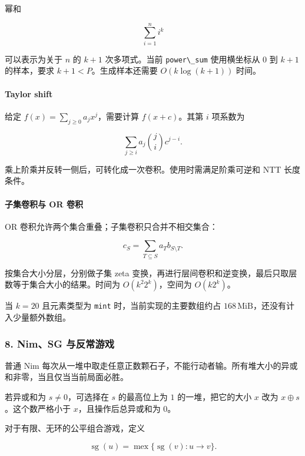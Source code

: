 幂和

\[
\sum_{i=1}^{n}i^k
\]

可以表示为关于 \(n\) 的 \(k+1\) 次多项式。当前 \passthrough{\lstinline!power\_sum!} 使用横坐标从 \(0\) 到 \(k+1\) 的样本，要求 \(k+1<P\)。生成样本还需要 \(O(k\log(k+1))\) 时间。

\hypertarget{taylor-shift}{%
\paragraph{Taylor shift}\label{taylor-shift}}

给定 \(f(x)=\sum_{j\ge0}a_jx^j\)，需要计算 \(f(x+c)\)。其第 \(i\) 项系数为

\[
\sum_{j\ge i}a_j\binom{j}{i}c^{j-i}.
\]

乘上阶乘并反转一侧后，可转化成一次卷积。使用时需满足阶乘可逆和 NTT 长度条件。

\hypertarget{ux5b50ux96c6ux5377ux79efux4e0e-or-ux5377ux79ef}{%
\paragraph{子集卷积与 OR 卷积}\label{ux5b50ux96c6ux5377ux79efux4e0e-or-ux5377ux79ef}}

OR 卷积允许两个集合重叠；子集卷积只合并不相交集合：

\[
c_S=\sum_{T\subseteq S}a_T b_{S\setminus T}.
\]

按集合大小分层，分别做子集 zeta 变换，再进行层间卷积和逆变换，最后只取层数等于集合大小的结果。时间为 \(O(k^2 2^k)\)，空间为 \(O(k2^k)\)。

当 \(k=20\) 且元素类型为 \passthrough{\lstinline!mint!} 时，当前实现的主要数组约占 \(168\,\mathrm{MiB}\)，还没有计入少量额外数组。

\hypertarget{nimsg-ux4e0eux53cdux5e38ux6e38ux620f}{%
\subsubsection{8. Nim、SG 与反常游戏}\label{nimsg-ux4e0eux53cdux5e38ux6e38ux620f}}

普通 Nim 每次从一堆中取走任意正数颗石子，不能行动者输。所有堆大小的异或和非零，当且仅当当前局面必胜。

若异或和为 \(s\ne0\)，可选择在 \(s\) 的最高位上为 \(1\) 的一堆，把它的大小 \(x\) 改为 \(x\mathbin{\oplus}s\)。这个数严格小于 \(x\)，且操作后总异或和为 \(0\)。

对于有限、无环的公平组合游戏，定义

\[
\operatorname{sg}(u)=\operatorname{mex}
\{\operatorname{sg}(v):u\to v\}.
\]

